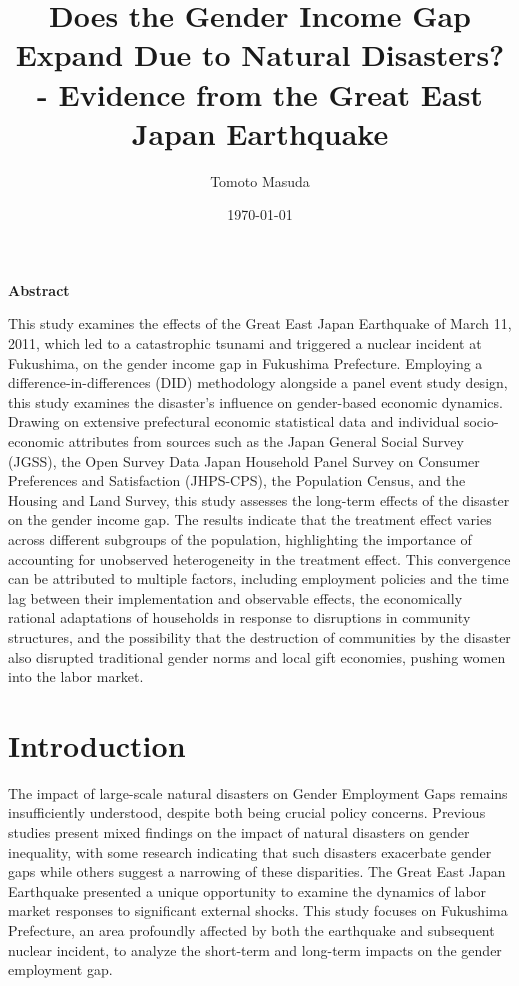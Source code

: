 \documentclass[a4paper,12pt]{article}
\begin{document}
\title{Does the Gender Income Gap Expand Due to Natural Disasters? - Evidence from the Great East Japan Earthquake}

\author{Tomoto Masuda}


\date{\today}

\maketitle

\begin{center}
    \textbf{Abstract}
\end{center}

\noindent
This study examines the effects of the Great East Japan Earthquake of March 11, 2011, which led to a catastrophic tsunami and triggered a nuclear incident at Fukushima, on the gender income gap in Fukushima Prefecture. Employing a difference-in-differences (DID) methodology alongside a panel event study design, this study examines the disaster's influence on gender-based economic dynamics. Drawing on extensive prefectural economic statistical data and individual socio-economic attributes from sources such as the Japan General Social Survey (JGSS), the Open Survey Data Japan Household Panel Survey on Consumer Preferences and Satisfaction (JHPS-CPS), the Population Census, and the Housing and Land Survey, this study assesses the long-term effects of the disaster on the gender income gap. The results indicate that the treatment effect varies across different subgroups of the population, highlighting the importance of accounting for unobserved heterogeneity in the treatment effect. This convergence can be attributed to multiple factors, including employment policies and the time lag between their implementation and observable effects, the economically rational adaptations of households in response to disruptions in community structures, and the possibility that the destruction of communities by the disaster also disrupted traditional gender norms and local gift economies, pushing women into the labor market.

\newpage

\tableofcontents


\clearpage
\section{Introduction}
\label{sec1}


The impact of large-scale natural disasters on Gender Employment Gaps remains insufficiently understood, despite both being crucial policy concerns. Previous studies present mixed findings on the impact of natural disasters on gender inequality, with some research indicating that such disasters exacerbate gender gaps while others suggest a narrowing of these disparities. The Great East Japan Earthquake presented a unique opportunity to examine the dynamics of labor market responses to significant external shocks. This study focuses on Fukushima Prefecture, an area profoundly affected by both the earthquake and subsequent nuclear incident, to analyze the short-term and long-term impacts on the gender employment gap.
\end{document}
